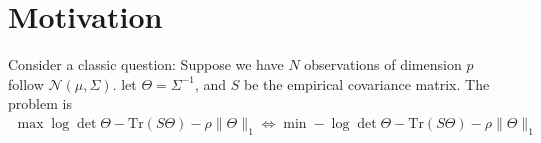 \documentclass[twoside]{article}
\begin{document}

\section{Motivation}
Consider a classic question: Suppose we have $N$ observations of dimension $p$ follow $\mathcal{N}(\mu,\Sigma)$. let $\Theta = \Sigma^{-1}$, and $S$ be the empirical covariance matrix. The problem is
\begin{align*}
    \max \log \det \Theta - \mathrm{Tr}(S\Theta) - \rho \lVert \Theta \rVert _1 \Leftrightarrow \min -\log \det \Theta - \mathrm{Tr}(S\Theta) - \rho \lVert \Theta \rVert _1
\end{align*}

%
%
\end{document}
